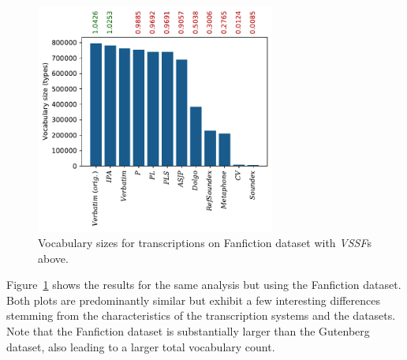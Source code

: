 \begin{figure}
  \centering
  \includegraphics[width=0.7\textwidth]{figures/vocab_sizes_2021-07-27_16-57-38_ff_pt}
  \caption{Vocabulary sizes for transcriptions on Fanfiction dataset with \textit{VSSF}s above.}
  \label{fig:vssf_transcriptions_ff}
\end{figure}

Figure~\ref{fig:vssf_transcriptions_ff} shows the results for the same analysis but using the Fanfiction dataset.
Both plots are predominantly similar but exhibit a few interesting differences stemming from the characteristics of the transcription systems and the datasets.
Note that the Fanfiction dataset is substantially larger than the Gutenberg dataset, also leading to a larger total vocabulary count.

